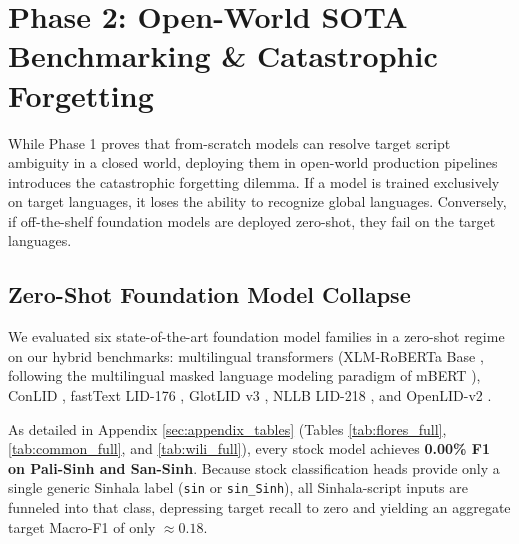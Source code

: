 \documentclass[11pt]{article}
\begin{document}
\FloatBarrier
\section{Phase 2: Open-World SOTA Benchmarking \& Catastrophic Forgetting}
\label{sec:phase2_open_world}

While Phase 1 proves that from-scratch models can resolve target script ambiguity in a closed world, deploying them in open-world production pipelines introduces the catastrophic forgetting dilemma. If a model is trained exclusively on target languages, it loses the ability to recognize global languages. Conversely, if off-the-shelf foundation models are deployed zero-shot, they fail on the target languages.

\subsection{Zero-Shot Foundation Model Collapse}
We evaluated six state-of-the-art foundation model families in a zero-shot regime on our hybrid benchmarks: multilingual transformers (XLM-RoBERTa Base \cite{conneau2020unsupervised}, following the multilingual masked language modeling paradigm of mBERT \cite{devlin2019bert}), ConLID \cite{dunn2023commonlid}, fastText LID-176 \cite{joulin2017bag}, GlotLID v3 \cite{kargaran2023glotlid}, NLLB LID-218 \cite{nllb2022}, and OpenLID-v2 \cite{burchell2023openlid}.

As detailed in Appendix \ref{sec:appendix_tables} (Tables \ref{tab:flores_full}, \ref{tab:common_full}, and \ref{tab:wili_full}), every stock model achieves \textbf{0.00\% F1 on Pali-Sinh and San-Sinh}. Because stock classification heads provide only a single generic Sinhala label (\texttt{sin} or \texttt{sin\_Sinh}), all Sinhala-script inputs are funneled into that class, depressing target recall to zero and yielding an aggregate target Macro-F1 of only $\approx 0.18$.
\end{document}
